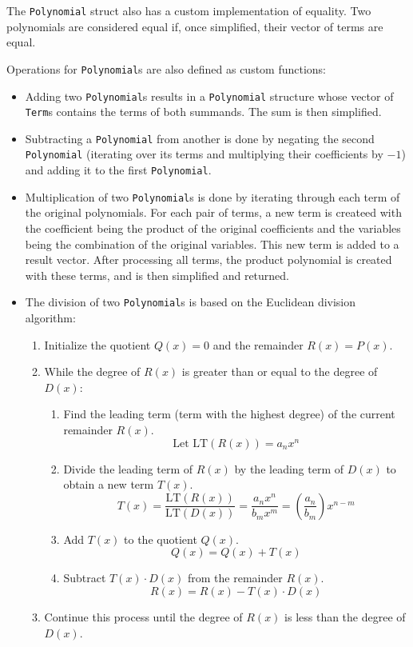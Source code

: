 

The \verb|Polynomial| struct also has a custom implementation of equality. Two polynomials are considered equal if, once simplified, their vector of terms are equal.



Operations for \verb|Polynomial|s are also defined as custom functions:

\begin{itemize}
    \item Adding two \verb|Polynomial|s results in a \verb|Polynomial| structure whose vector of \verb|Term|s contains the terms of both summands. The sum is then simplified.
    \item Subtracting a \verb|Polynomial| from another is done by negating the second \verb|Polynomial| (iterating over its terms and multiplying their coefficients by $-1$) and adding it to the first \verb|Polynomial|.
    \item Multiplication of two \verb|Polynomial|s is done by iterating through each term of the original polynomials. For each pair of terms, a new term is createed with the coefficient being the product of the original coefficients and the variables being the combination of the original variables. This new term is added to a result vector. After processing all terms, the product polynomial is created with these terms, and is then simplified and returned.
    \item The division of two \verb|Polynomial|s is based on the Euclidean division algorithm:
    \begin{enumerate}
        \item Initialize the quotient \( Q(x) = 0 \) and the remainder \( R(x) = P(x) \).
        \item While the degree of \( R(x) \) is greater than or equal to the degree of \( D(x) \):
        \begin{enumerate}
            \item Find the leading term (term with the highest degree) of the current remainder \( R(x) \).
            \[
            \text{Let } \text{LT}(R(x)) = a_n x^n
            \]
            \item Divide the leading term of \( R(x) \) by the leading term of \( D(x) \) to obtain a new term \( T(x) \).
            \[
            T(x) = \frac{\text{LT}(R(x))}{\text{LT}(D(x))} = \frac{a_n x^n}{b_m x^m} = \left( \frac{a_n}{b_m} \right) x^{n-m}
            \]
            \item Add \( T(x) \) to the quotient \( Q(x) \).
            \[
            Q(x) = Q(x) + T(x)
            \]
            \item Subtract \( T(x) \cdot D(x) \) from the remainder \( R(x) \).
            \[
            R(x) = R(x) - T(x) \cdot D(x)
            \]
        \end{enumerate}
        \item Continue this process until the degree of \( R(x) \) is less than the degree of \( D(x) \).
    \end{enumerate}
\end{itemize}

